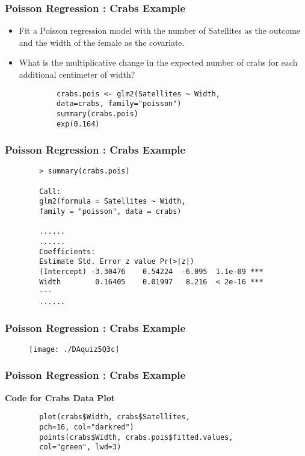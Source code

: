 \documentclass[MASTER.tex]{subfiles}
\begin{document}
	\begin{frame}[fragile]
		\frametitle{Poisson Regression :  Crabs Example}
		\begin{itemize}
		\item Fit a Poisson regression model with the number of Satellites as the outcome and the width of the female as the covariate. 
		
		\item What is the multiplicative change in the expected number of crabs for each additional centimeter of width?
		\end{itemize}
		\begin{framed}
			\begin{verbatim}
			crabs.pois <- glm2(Satellites ~ Width, 
			data=crabs, family="poisson")
			summary(crabs.pois)
			exp(0.164)
			\end{verbatim}
		\end{framed}
		
	\end{frame}
	\begin{frame}[fragile]
		\frametitle{Poisson Regression :  Crabs Example}
		\begin{verbatim}
		> summary(crabs.pois)
		
		Call:
		glm2(formula = Satellites ~ Width, 
		family = "poisson", data = crabs)
		
		...... 
		......
		Coefficients:
		Estimate Std. Error z value Pr(>|z|)    
		(Intercept) -3.30476    0.54224  -6.095  1.1e-09 ***
		Width        0.16405    0.01997   8.216  < 2e-16 ***
		---
		...... 
		\end{verbatim}
	
\end{frame}
\begin{frame}[fragile]
	\frametitle{Poisson Regression :  Crabs Example}
	\begin{figure}[h!]
		\centering
		\texttt{[image: ./DAquiz5Q3c]}
	\end{figure}
\end{frame}
\begin{frame}[fragile]
	\frametitle{Poisson Regression :  Crabs Example}
	
	\textbf{Code for Crabs Data Plot}
	\begin{framed}
		\begin{verbatim}
		plot(crabs$Width, crabs$Satellites,
		pch=16, col="darkred")
		points(crabs$Width, crabs.pois$fitted.values, 
		col="green", lwd=3)
		\end{verbatim}
	\end{framed}
\end{frame}
\end{document}
